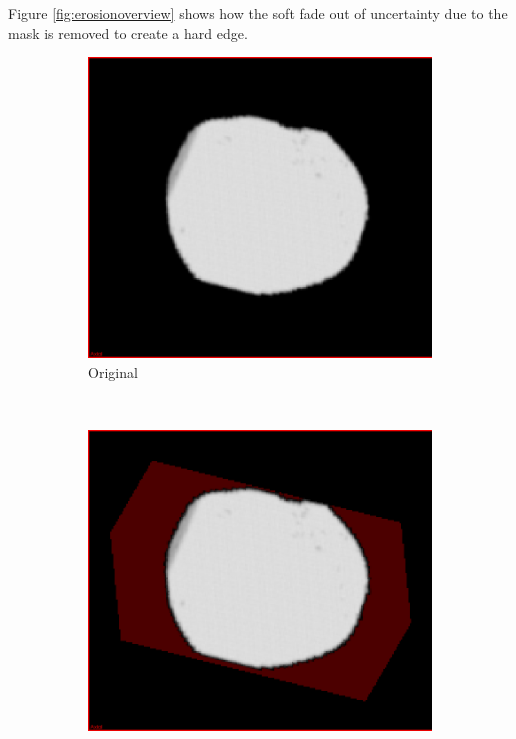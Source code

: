 Figure \ref{fig:erosionoverview} shows how the soft fade out of uncertainty due to the mask is removed to create a hard edge.

\begin{figure}[h]
  \centering
  \begin{subfigure}[b]{0.3\textwidth}
    \includegraphics[width=\textwidth]{images/erosion/erosion_0.png}
    \caption{Original}
    \label{fig:erosion0}
  \end{subfigure}%
  ~ %
  \begin{subfigure}[b]{0.3\textwidth}
    \includegraphics[width=\textwidth]{images/erosion/erosion_1.png}

\end{subfigure}
\end{figure}
